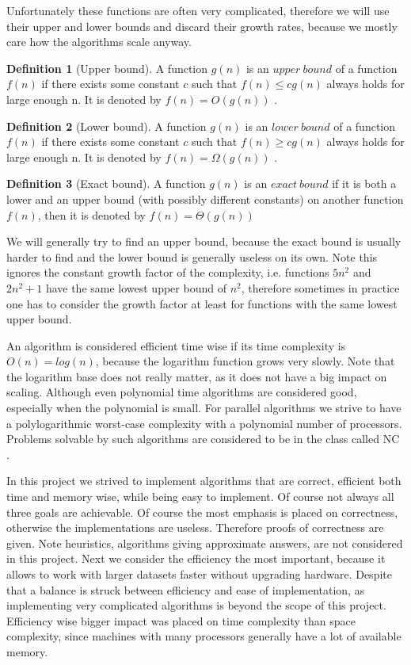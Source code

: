 \documentclass{report}
\theoremstyle{plain}
\theoremstyle{definition}
\newtheorem{definition}{Definition}
\theoremstyle{remark}
\numberwithin{definition}{chapter}
\numberwithin{example}{chapter}
\numberwithin{figure}{chapter}
\begin{document}
Unfortunately these functions are often very complicated, therefore we will use their upper and lower bounds and discard their growth rates, because we mostly care how the algorithms scale anyway.

\begin{definition}[Upper bound]
A function $g(n)$ is an $upper \ bound$ of a function $f(n)$ if there exists some constant $c$ such that $f(n)\leq cg(n)$ always holds for large enough n. It is denoted by $f(n) = O(g(n))$ \cite{skiena504algorithm}.
\end{definition}

\begin{definition}[Lower bound]
A function $g(n)$ is an $lower \ bound$ of a function $f(n)$ if there exists some constant $c$ such that $f(n)\geq cg(n)$ always holds for large enough n. It is denoted by $f(n) = \Omega(g(n))$ \cite{skiena504algorithm}.
\end{definition}

\begin{definition}[Exact bound]
A function $g(n)$ is an $exact \ bound$ if it is both a lower and an upper bound (with possibly different constants) on another function $f(n)$, then it is denoted by $f(n) = \Theta(g(n))$
\end{definition}

We will generally try to find an upper bound, because the exact bound is usually harder to find and the lower bound is generally useless on its own. Note this ignores the constant growth factor of the complexity, i.e. functions $5n^2$ and $2n^2+1$ have the same lowest upper bound of $n^2$, therefore sometimes in practice one has to consider the growth factor at least for functions with the same lowest upper bound.

An algorithm is considered efficient time wise if its time complexity is $O(n)=log(n)$, because the logarithm function grows very slowly. Note that the logarithm base does not really matter, as it does not have a big impact on scaling. Although even polynomial time algorithms are considered good, especially when the polynomial is small. For parallel algorithms we strive to have a polylogarithmic worst-case complexity with a polynomial number of processors. Problems solvable by such algorithms are considered to be in the class called NC \cite{berman1996fundamentals}.

In this project we strived to implement algorithms that are correct, efficient both time and memory wise, while being easy to implement. Of course not always all three goals are achievable. Of course the most emphasis is placed on correctness, otherwise the implementations are useless. Therefore proofs of correctness are given. Note heuristics, algorithms giving approximate answers, are not considered in this project. Next we consider the efficiency the most important, because it allows to work with larger datasets faster without upgrading hardware. Despite that a balance is struck between efficiency and ease of implementation, as implementing very complicated algorithms is beyond the scope of this project. Efficiency wise bigger impact was placed on time complexity than space complexity, since machines with many processors generally have a lot of available memory.
\end{document}

